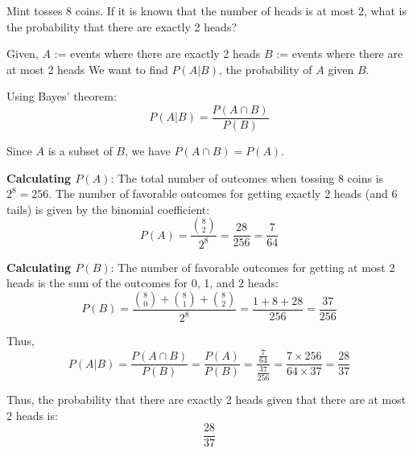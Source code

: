 \documentclass[a4paper, 10pt]{article}
\begin{document}
\begin{problem}
Mint tosses 8 coins. If it is known that the number of heads is at most 2,
what is the probability that there are exactly 2 heads?
\end{problem}

\begin{solution}
	Given, \newline
	\(A\) := events where there are exactly 2 heads \newline
	\(B\) := events where there are at most 2 heads \newline
	We want to find \(P(A|B)\), the probability of \(A\) given \(B\).
	
	\myspace

	\par Using Bayes' theorem:
	\[
		P(A|B) = \frac{P(A \cap B)}{P(B)}
	\]

	Since \(A\) is a subset of \(B\), we have \(P(A \cap B) = P(A)\).
	
	\myspace

	\par\textbf{Calculating \(P(A)\)}: \newline
	The total number of outcomes when tossing 8 coins is \(2^8 = 256\).
	The number of favorable outcomes for getting exactly 2 heads (and 6 tails) is given by the binomial coefficient:
	\[
		P(A) = \frac{\binom{8}{2}}{2^8} = \frac{28}{256} = \frac{7}{64}
	\]

	\par\textbf{Calculating \(P(B)\)}: \newline
	The number of favorable outcomes for getting at most 2 heads is the sum of the outcomes for 0, 1, and 2 heads:
	\[
		P(B) = \frac{\binom{8}{0} + \binom{8}{1} + \binom{8}{2}}{2^8} = \frac{1 + 8 + 28}{256} = \frac{37}{256}
	\]

	\par Thus,
	\[
		P(A|B) = \frac{P(A \cap B)}{P(B)} = \frac{P(A)}{P(B)} = \frac{\frac{7}{64}}{\frac{37}{256}} = \frac{7 \times 256}{64 \times 37} = \frac{28}{37}
	\]

	Thus, the probability that there are exactly 2 heads given that there are at most 2 heads is:
	\[
		\boxed{\frac{28}{37}}
	\]
\end{solution}
\end{document}
